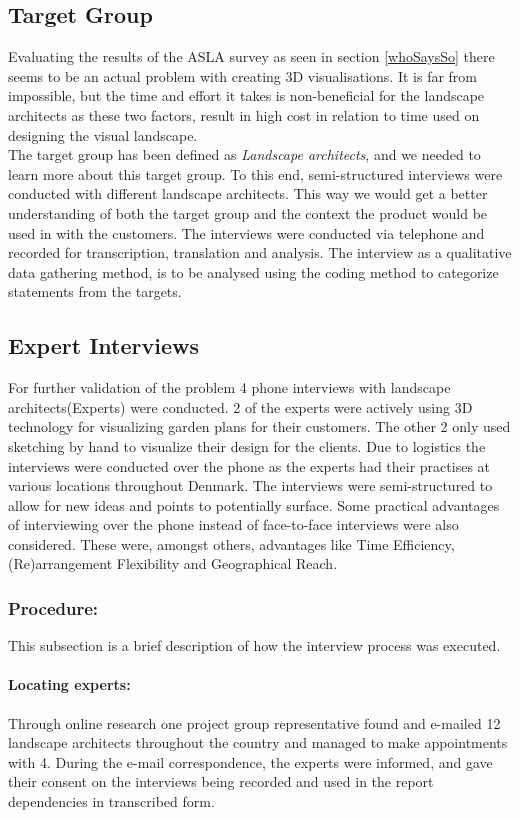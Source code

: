 	\subsection{Target Group}\label{sec:targetGroup}
	Evaluating the results of the ASLA survey as seen in section \ref{whoSaysSo} there seems to be an actual problem with creating 3D visualisations. It is far from impossible, but the time and effort it takes is non-beneficial for the landscape architects as these two factors, result in high cost in relation to time used on designing the visual landscape. \\
	The target group has been defined as \textit{Landscape architects}, and we needed to learn more about this target group. To this end, semi-structured interviews were conducted with different landscape architects. This way we would get a better understanding of both the target group and the context the product would be used in with the customers. The interviews were conducted via telephone and recorded for transcription, translation and analysis. The interview as a qualitative data gathering method, is to be analysed using the coding method to categorize statements from the targets.
	
	\subsection{Expert Interviews}\label{sec:expertInterviews}
	For further validation of the problem 4 phone interviews with landscape architects(Experts) were conducted. 2 of the experts were actively using 3D technology for visualizing garden plans for their customers. The other 2 only used sketching by hand to visualize their design for the clients. Due to logistics the interviews were conducted over the phone as the experts had their practises at various locations throughout Denmark. The interviews were semi-structured to allow for new ideas and points to potentially surface. Some practical advantages of interviewing over the phone instead of face-to-face interviews were also considered. These were, amongst others, advantages like Time Efficiency, (Re)arrangement Flexibility and Geographical Reach\cite{telephoneInterview}. 
		
		\subsubsection{Procedure:}
		This subsection is a brief description of how the interview process was executed.
		
		\paragraph*{Locating experts:}
		Through online research one project group 	representative found and e-mailed 12 landscape architects throughout the country and managed to make appointments with 4. During the e-mail correspondence, the experts were informed, and gave their consent on the interviews being recorded and used in the report dependencies in transcribed form.
		
